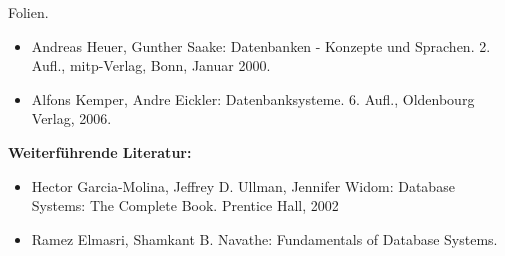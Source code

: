 \begin{course}
\begin{content}
\end{content}

\begin{media}Folien.

\end{media}

\begin{literature}\begin{itemize}\item Andreas Heuer, Gunther Saake: Datenbanken - Konzepte und Sprachen. 2. Aufl., mitp-Verlag, Bonn, Januar 2000.  \item Alfons Kemper, Andre Eickler: Datenbanksysteme. 6. Aufl., Oldenbourg Verlag, 2006.  \end{itemize}

\textbf{Weiterführende Literatur:}

 \begin{itemize}\item Hector Garcia-Molina, Jeffrey D. Ullman, Jennifer Widom: Database Systems: The Complete Book. Prentice Hall, 2002  \item Ramez Elmasri, Shamkant B. Navathe: Fundamentals of Database Systems.  \end{itemize}\end{literature}



\end{course}